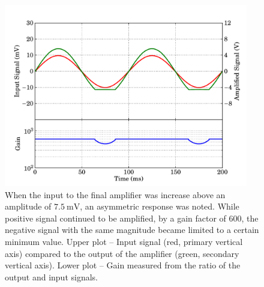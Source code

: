 \begin{figure}[t]
\begin{center}
\includegraphics[width = 0.95\textwidth]{figures/final_amp_gain_limit}
\caption[Asymmetric limit to input of the final amplifier]{When the input to the final amplifier was increase above an amplitude of $7.5~\mathrm{mV}$, an asymmetric response was noted. While positive signal continued to be amplified, by a gain factor of 600, the negative signal with the same magnitude became limited to a certain minimum value. Upper plot -- Input signal (red, primary vertical axis) compared to the output of the amplifier (green, secondary vertical axis). Lower plot -- Gain measured from the ratio of the output and input signals.}
\label{fig:finalAmp_gain_limit}
\end{center}
\end{figure}
\par 
